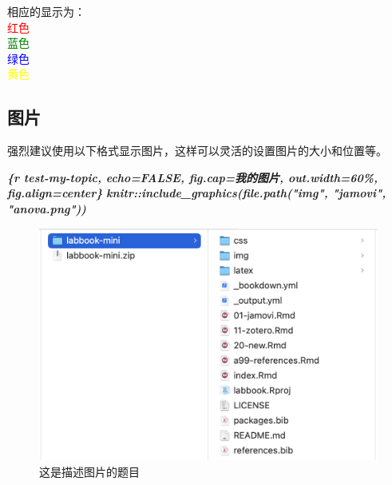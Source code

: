 \documentclass[]{ctexbook}
\newenvironment{Shaded}{\begin{snugshade}}{\end{snugshade}}
\newcommand{\InformationTok}[1]{\textcolor[rgb]{0.56,0.35,0.01}{\textbf{\textit{#1}}}}
\theoremstyle{definition}
\theoremstyle{definition}
\theoremstyle{definition}
\theoremstyle{definition}
\theoremstyle{remark}
\begin{document}
相应的显示为：\\
\textcolor{red}{红色}\\
\textcolor{green}{蓝色}\\
\textcolor{blue}{绿色}\\
\textcolor{yellow}{黄色}

\subsection{图片}\label{ux56feux7247}

强烈建议使用以下格式显示图片，这样可以灵活的设置图片的大小和位置等。

\begin{Shaded}
\begin{Highlighting}[]
\InformationTok{\textasciigrave{}\textasciigrave{}\textasciigrave{}\{r test{-}my{-}topic, echo=FALSE, fig.cap=\textquotesingle{}我的图片\textquotesingle{}, out.width=\textquotesingle{}60\%\textquotesingle{}, fig.align=\textquotesingle{}center\textquotesingle{}\}}
\InformationTok{knitr::include\_graphics(file.path("img", "jamovi", "anova.png"))}
\InformationTok{\textasciigrave{}\textasciigrave{}\textasciigrave{}}
\end{Highlighting}
\end{Shaded}

\begin{figure}

{\centering \includegraphics[width=0.7\linewidth]{img/contribute/mini_dir} 

}

\caption{这是描述图片的题目}\label{fig:qa-img-run}
\end{figure}
\end{document}
